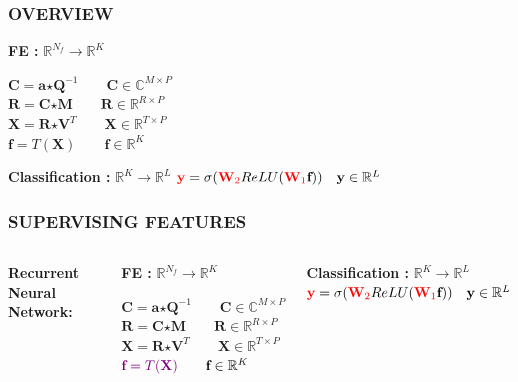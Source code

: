 \documentclass{beamer}
\begin{document}
\begin{frame}
\frametitle{OVERVIEW}
\begin{block}{\textbf{FE :} $\mathbb{R}^{N_{f}} \rightarrow \mathbb{R}^{K}$}

$\textbf{C} = \textbf{a} \bm{\star} \textbf{Q}^{-1} \qquad \textbf{C} \in \mathbb{C}^{M \times P}$\\
$\textbf{R} = \textbf{C} \bm{\star} \textbf{M} \qquad \textbf{R} \in \mathbb{R}^{R \times P}$\\
$\textbf{X} = \textbf{R} \bm{\star} \textbf{V}^{T} \qquad \textbf{X} \in \mathbb{R}^{T \times P}$\\
$\textbf{f} = T(\textbf{X}) \qquad \textbf{f} \in \mathbb{R}^{K}$\\
\end{block}

\begin{block}{\textbf{Classification :} $\mathbb{R}^{K} \rightarrow \mathbb{R}^{L}$}
${\color{red}\textbf{y}} = \sigma({\color{red}\textbf{W}_{2}}ReLU({\color{red}\textbf{W}_{1}}\textbf{f})) \quad \textbf{y} \in \mathbb{R}^{L}$
\end{block}
\end{frame}

\begin{frame}
\frametitle{SUPERVISING FEATURES}
\begin{columns}[c]
\textbf{Recurrent Neural Network:}
\bigskip

\begin{block}{\textbf{FE :} $\mathbb{R}^{N_{f}} \rightarrow \mathbb{R}^{K}$}

$\textbf{C} = \textbf{a} \bm{\star} \textbf{Q}^{-1} \qquad \textbf{C} \in \mathbb{C}^{M \times P}$\\
$\textbf{R} = \textbf{C} \bm{\star} \textbf{M} \qquad \textbf{R} \in \mathbb{R}^{R \times P}$\\
$\textbf{X} = \textbf{R} \bm{\star} \textbf{V}^{T} \qquad \textbf{X} \in \mathbb{R}^{T \times P}$\\
${\color{violet}\textbf{f} = T(\textbf{X})} \qquad \textbf{f} \in \mathbb{R}^{K}$\\
\end{block}
\begin{block}{\textbf{Classification :} $\mathbb{R}^{K} \rightarrow \mathbb{R}^{L}$}
${\color{red}\textbf{y}} = \sigma({\color{red}\textbf{W}_{2}}ReLU({\color{red}\textbf{W}_{1}}\textbf{f})) \quad \textbf{y} \in \mathbb{R}^{L}$
\end{block}
\end{columns}
\end{frame}
\end{document}
